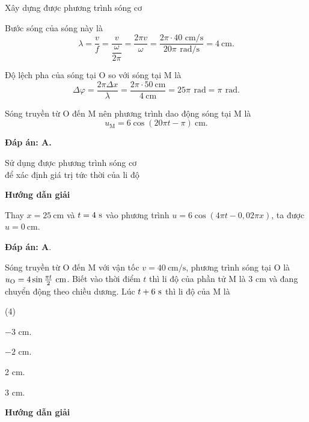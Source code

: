 \begin{dang}{Xây dựng được phương trình sóng cơ}
{		Bước sóng của sóng này là
		$$\lambda=\dfrac{v}{f}=\dfrac{v}{\dfrac{\omega}{2\pi }}=\dfrac{2\pi v}{\omega}=\dfrac{2\pi \cdot40\textrm{ cm/s}}{20\pi\,\SI{}{\radian/\second}}=\SI{4}{\centi\meter}.$$ 
		
		Độ lệch pha của sóng tại O so với sóng tại M là
		$$\Delta \varphi =\dfrac{2\pi \Delta x}{\lambda }=\dfrac{2\pi \cdot\SI{50}{\centi\meter}}{\SI{4}{\centi\meter}}=25\pi\,\SI{}{\radian}=\pi\,\SI{}{\radian}.$$
		
		Sóng truyền từ O đến M nên phương trình dao động sóng tại M là
		$${{u}_{\text{M}}}=6\cos \left( 20\pi t-\pi \right)\SI{}{\centi\meter}.$$
		
		\textbf{Đáp án: A.}
	}
	
\end{dang}
\begin{dang}{Sử dụng được phương trình sóng cơ\\ để xác định giá trị tức thời của li độ}
	{
		\begin{center}
			\textbf{Hướng dẫn giải}
		\end{center}
		
		Thay $x=25\ \text{cm}$ và $t=4\ \text s$ vào phương trình $u=6 \cos (4\pi t - 0,02 \pi x)$, ta được $u=0\ \text{cm}$.
		
		
		\textbf{Đáp án: A}.
	}
	
	{
		Sóng truyền từ O đến M với vận tốc $v=40\ \text{cm/s}$, phương trình sóng tại O là\\ $u_\text O = 4 \sin \frac{\pi t}{2}\ \text{cm}$. Biết vào thời điểm $t$ thì li độ của phần tử M là 3 cm và đang chuyển động theo chiều dương. Lúc $t+6\ \text s$ thì li độ của M là
		
		\begin{mcq}(4)
			\item $-3$ cm.
			\item $-2$ cm.
			\item 2 cm.
			\item 3 cm.
		\end{mcq}
	}{
		\begin{center}
			\textbf{Hướng dẫn giải}
		\end{center}
		
}
\end{dang}
